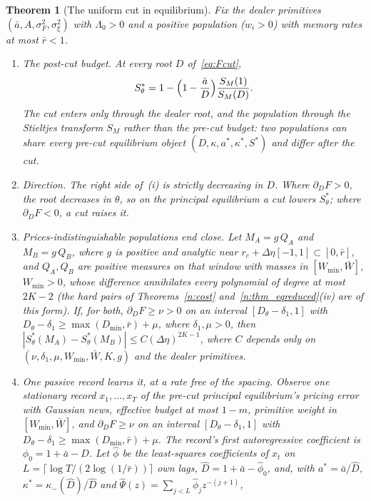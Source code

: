 \documentclass[11pt,letterpaper]{article}
\newtheorem{theorem}{Theorem}[section]
\theoremstyle{definition}
\begin{document}
\begin{theorem}[The uniform cut in equilibrium]\label{n:eqcut}
Fix the dealer primitives $(\bar a, A, \sigma_F^2, \sigma_\xi^2)$ with $\Lambda_0 > 0$ and a positive population ($w_i > 0$) with memory rates at most $\bar r < 1$.
\begin{enumerate}
  \item[(i)] \emph{The post-cut budget.} At every root $D$ of~\eqref{eq:Fcut},
  \[
    S^*_\theta = 1 - \Bigl(1 - \frac{\bar a}{D}\Bigr)\frac{S_M(1)}{S_M(D)}.
  \]
  The cut enters only through the dealer root, and the population through the Stieltjes transform $S_M$ rather than the pre-cut budget: two populations can share every pre-cut equilibrium object $(D, \kappa, a^*, \kappa^*, S^*)$ and differ after the cut.
  \item[(ii)] \emph{Direction.} The right side of~(i) is strictly decreasing in $D$. Where $\partial_D F > 0$, the root decreases in $\theta$, so on the principal equilibrium a cut lowers $S^*_\theta$; where $\partial_D F < 0$, a cut raises it.
  \item[(iii)] \emph{Prices-indistinguishable populations end close.} Let $M_A = g\,Q_A$ and $M_B = g\,Q_B$, where $g$ is positive and analytic near $r_c + \Delta\eta[-1, 1] \subset [0, \bar r]$, and $Q_A, Q_B$ are positive measures on that window with masses in $[W_{\min}, \bar W]$, $W_{\min} > 0$, whose difference annihilates every polynomial of degree at most $2K - 2$ (the hard pairs of Theorems~\ref{n:cost} and~\ref{n:thm_eqreduced}(iv) are of this form). If, for both, $\partial_D F \ge \nu > 0$ on an interval $[D_\theta - \delta_1, 1]$ with $D_\theta - \delta_1 \ge \max(D_{\min}, \bar r) + \mu$, where $\delta_1, \mu > 0$, then $|S^*_\theta(M_A) - S^*_\theta(M_B)| \le C (\Delta\eta)^{2K-1}$, where $C$ depends only on $(\nu, \delta_1, \mu, W_{\min}, \bar W, K, g)$ and the dealer primitives.
  \item[(iv)] \emph{One passive record learns it, at a rate free of the spacing.} Observe one stationary record $x_1, \dots, x_T$ of the pre-cut principal equilibrium's pricing error with Gaussian news, effective budget at most $1 - m$, primitive weight in $[W_{\min}, \bar W]$, and $\partial_D F \ge \nu$ on an interval $[D_\theta - \delta_1, 1]$ with $D_\theta - \delta_1 \ge \max(D_{\min}, \bar r) + \mu$. The record's first autoregressive coefficient is $\phi_0 = 1 + \bar a - D$. Let $\hat\phi$ be the least-squares coefficients of $x_t$ on $L = \lceil \log T / (2\log(1/\bar r)) \rceil$ own lags, $\hat D = 1 + \bar a - \hat\phi_0$, and, with $a^* = \bar a/\hat D$, $\kappa^* = \kappa_-(\hat D)/\hat D$ and $\hat\Psi(z) = \sum_{j < L} \hat\phi_j z^{-(j+1)}$,

\end{enumerate}
\end{theorem}
\end{document}
